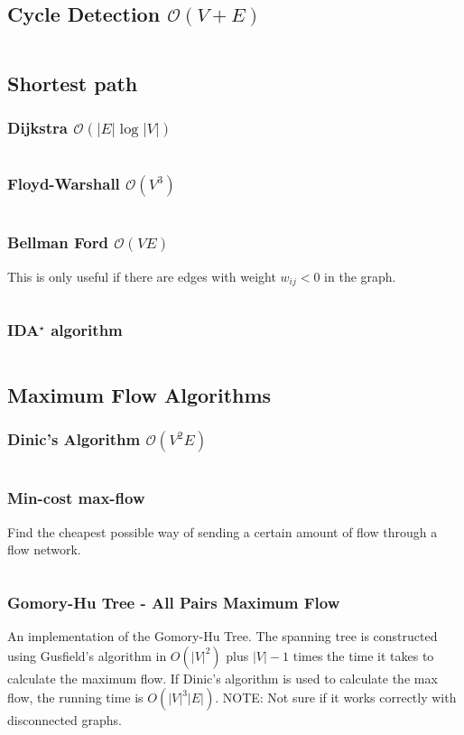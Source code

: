 \documentclass[8pt,a4paper,landscape,oneside]{amsart}
\newcommand{\code}[1]{\inputminted[fontsize=\normalsize,baselinestretch=1,breaklines,tabsize=2]{cpp}{code/#1}}
\begin{document}
\begin{multicols*}{3}
\subsection{Cycle Detection $\mathcal{O}(V + E)$}
\code{findcycle.cpp}

\subsection{Shortest path}

\subsubsection{Dijkstra $\mathcal{O}(|E|\log{|V|})$}
\code{graphs/dijkstra.cpp}

\subsubsection{Floyd-Warshall $\mathcal{O}(V^{3})$}
\code{graphs/floydwarshall.cpp}

\subsubsection{Bellman Ford $\mathcal{O}(V E)$}
This is only useful if there are edges with weight $w_{i j} < 0$ in the graph.
\code{graphs/bellmanford.cpp}

\subsubsection{IDA$^\star$ algorithm}
\code{graphs/idastar.cpp}

\subsection{Maximum Flow Algorithms}
\subsubsection{Dinic's Algorithm $\mathcal{O}(V^{2} E)$}
\code{graphs/dinic.cpp}

\subsubsection{Min-cost max-flow}
Find the cheapest possible way of sending a certain amount of flow through a flow network.
\code{graphs/mincostmaxflow.cpp}

\subsubsection{Gomory-Hu Tree - All Pairs Maximum Flow}
An implementation of the Gomory-Hu Tree. The spanning tree is constructed using Gusfield's algorithm
in $O(|V| ^ 2)$ plus $|V|-1$ times the time it takes to calculate the maximum flow.
If Dinic's algorithm is used to calculate the max flow, the running time is $O(|V|^3|E|)$.
NOTE: Not sure if it works correctly with disconnected graphs.
\code{graphs/gomory_hu_tree.cpp}


\end{multicols*}
\end{document}
